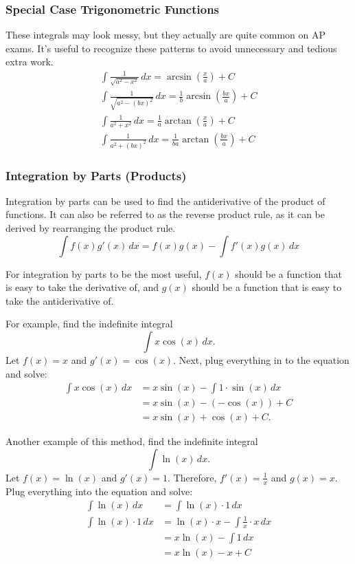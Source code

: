 \documentclass[12pt]{article}
\begin{document}
\subsubsection{Special Case Trigonometric Functions}
\label{sec:arctanintegral}
These integrals may look messy, but they actually are quite common on AP exams. It's useful to recognize these patterns to avoid unnecessary and tedious extra work.
\begin{gather*}
    \int \frac{1}{\sqrt{a^2 - x^2}} \, dx = \arcsin \left( \frac{x}{a} \right) + C \\[6pt]
    \int \frac{1}{\sqrt{a^2 - (bx)^2}} \, dx = \frac{1}{b} \arcsin \left( \frac{bx}{a} \right) + C \\[6pt]
    \int \frac{1}{a^2 + x^2} \, dx = \frac{1}{a} \arctan \left( \frac{x}{a} \right) + C \\[6pt]
    \int \frac{1}{a^2 + (bx)^2} \, dx = \frac{1}{ba} \arctan \left( \frac{bx}{a} \right) + C
\end{gather*}

\subsubsection{Integration by Parts (Products)}
Integration by parts can be used to find the antiderivative of the product of functions. It can also be referred to as the reverse product rule, as it can be derived by rearranging the product rule.
\[ \int f(x) g'(x) \, dx = f(x) g(x) - \int f'(x) g(x) \, dx \]

For integration by parts to be the most useful, $f(x)$ should be a function that is easy to take the derivative of, and $g(x)$ should be a function that is easy to take the antiderivative of.

\noindent For example, find the indefinite integral
\[ \int x \cos(x) \, dx. \]
Let $f(x) = x$ and $g'(x) = \cos(x)$. Next, plug everything in to the equation and solve:
\begin{align*}
    \int x \cos(x) \, dx & = x \sin(x) - \int 1 \cdot \sin(x) \, dx  \\
                         & = x \sin(x) - \left( -\cos(x) \right) + C \\
                         & = x\sin(x) + \cos(x) + C.
\end{align*}

\noindent Another example of this method, find the indefinite integral
\[ \int \ln(x) \, dx. \]
Let $f(x) = \ln(x)$ and $g'(x) = 1$. Therefore, $f'(x) = \frac{1}{x}$ and $g(x) = x$. Plug everything into the equation and solve:
\begin{align*}
    \int \ln(x) \, dx         & = \int \ln(x) \cdot 1 \, dx                       \\
    \int \ln(x) \cdot 1 \, dx & = \ln(x) \cdot x - \int \frac{1}{x} \cdot x \, dx \\[6pt]
                              & = x \ln(x) - \int 1 \, dx                         \\
                              & = x \ln(x) - x + C
\end{align*}
\end{document}
